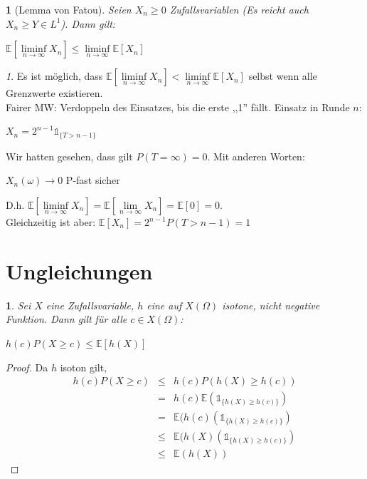\documentclass[10pt,a4paper]{report}
\numberwithin{equation}{section}
\numberwithin{figure}{section}
\theoremstyle{plain}
\theoremstyle{definition}
\theoremstyle{remark}
\newtheorem{rem}[thm]{\protect\remarkname}
\theoremstyle{plain}
\newtheorem{prop}[thm]{\protect\propositionname}
\providecommand{\propositionname}{Satz}
\providecommand{\remarkname}{Bemerkung}
\newcommand{\1}{ \mathbb{1} } %
\begin{document}
\begin{prop}[Lemma von Fatou]
  Seien $X_n\geq 0$ Zufallsvariablen (Es reicht auch $X_n \geq Y \in L^1$). Dann
  gilt:
  \begin{center}
    $\mathbb{E}[\liminf\limits_{n \to \infty} X_n]\leq
    \liminf\limits_{n \to \infty} \mathbb{E}[X_n]$
  \end{center}
\end{prop}
\begin{rem} 
  Es ist möglich, dass $\mathbb{E}[\liminf\limits_{n \to \infty} X_n] < \liminf\limits_{n \to \infty} \mathbb{E}[X_n]$ selbst wenn alle Grenzwerte existieren.\\
  Fairer MW: Verdoppeln des Einsatzes, bis die erste ,,1''
  fällt. Einsatz in Runde $n$:
  \begin{center}
    $X_n=2^{n-1}\1_{\{T>n-1\}}$
  \end{center}
  Wir hatten gesehen, dass gilt $P(T=\infty)=0$. Mit anderen Worten:
  \begin{center}
    $X_n(\omega) \to 0$ P-fast sicher
  \end{center}
  D.h. $\mathbb{E}[\liminf\limits_{n \to \infty} X_n]=\mathbb{E}[\lim\limits_{n \to \infty} X_n]=\mathbb{E}[0]=0$.\\
  Gleichzeitig ist aber: $\mathbb{E}[X_n]=2^{n-1}P(T>n-1)=1$\\
\end{rem}

\section{Ungleichungen}
\label{sec:ungleichungen}

\begin{prop}  %
  Sei $X$ eine Zufallsvariable, $h$ eine auf $X(\Omega)$ isotone, nicht negative
  Funktion. Dann gilt für alle $c \in X(\Omega)$:
  \begin{center}
    $h(c)P(X\geq c) \leq \mathbb{E}[h(X)]$
  \end{center}
\end{prop}
\begin{proof}
  Da $h$ isoton gilt,
  \begin{eqnarray*}
    h(c)P(X\geq c) &\leq & h(c)P(h(X)\geq h(c))\\
    &=& h(c) \mathbb{E}(\1_{\{h(X)\geq h(c)\}})\\
    &=& \mathbb{E}(h(c)(\1_{\{h(X)\geq h(c)\}})\\
    &\leq &\mathbb{E}(h(X)(\1_{\{h(X)\geq h(c)\}})\\
    &\leq &\mathbb{E}(h(X))
  \end{eqnarray*}
\end{proof}
\end{document}
